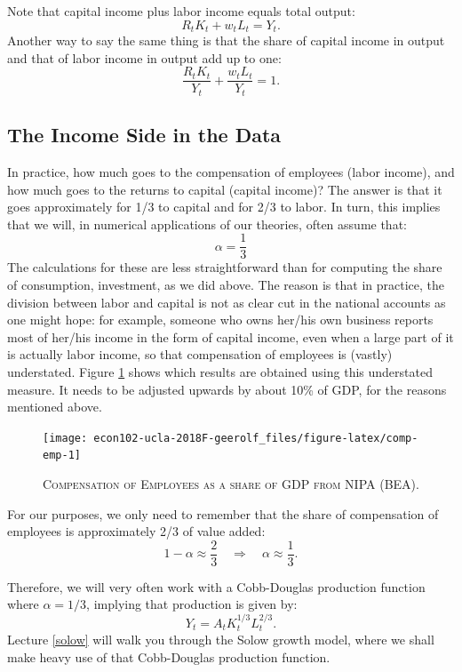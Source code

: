 \documentclass[]{book}
\theoremstyle{definition}
\theoremstyle{definition}
\theoremstyle{definition}
\theoremstyle{remark}
\begin{document}
Note that capital income plus labor income equals total output:
\[R_t K_t + w_t L_t = Y_t.\] Another way to say the same thing is that
the share of capital income in output and that of labor income in output
add up to one: \[\boxed{\frac{R_t K_t}{Y_t} + \frac{w_t L_t}{Y_t}=1}.\]

\subsection{The Income Side in the
Data}\label{the-income-side-in-the-data}

In practice, how much goes to the compensation of employees (labor
income), and how much goes to the returns to capital (capital income)?
The answer is that it goes approximately for 1/3 to capital and for 2/3
to labor. In turn, this implies that we will, in numerical applications
of our theories, often assume that: \[\alpha = \frac{1}{3}\] The
calculations for these are less straightforward than for computing the
share of consumption, investment, as we did above. The reason is that in
practice, the division between labor and capital is not as clear cut in
the national accounts as one might hope: for example, someone who owns
her/his own business reports most of her/his income in the form of
capital income, even when a large part of it is actually labor income,
so that compensation of employees is (vastly) understated. Figure
\ref{fig:comp-emp} shows which results are obtained using this
understated measure. It needs to be adjusted upwards by about 10\% of
GDP, for the reasons mentioned above.




\begin{figure}

{\centering \texttt{[image: econ102-ucla-2018F-geerolf\_files/figure-latex/comp-emp-1]} 

}

\caption{\textsc{Compensation of Employees as a share of GDP
from NIPA (BEA)}.}\label{fig:comp-emp}
\end{figure}

For our purposes, we only need to remember that the share of
compensation of employees is approximately 2/3 of value added:
\[1-\alpha \approx \frac{2}{3} \quad \Rightarrow \quad \boxed{\alpha \approx \frac{1}{3}}.\]

Therefore, we will very often work with a Cobb-Douglas production
function where \(\alpha=1/3\), implying that production is given by:
\[Y_t = A_t K_t^{1/3} L_t^{2/3}.\] Lecture \ref{solow} will walk you
through the Solow growth model, where we shall make heavy use of that
Cobb-Douglas production function.
\end{document}
